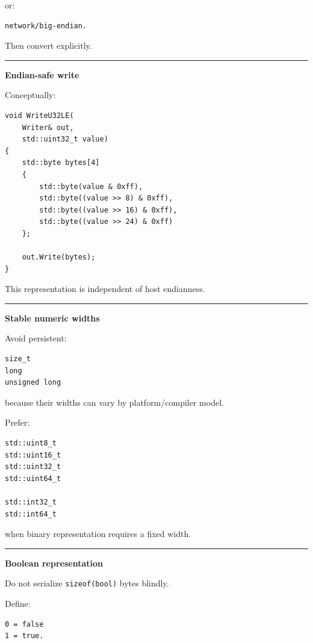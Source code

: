 or:

\begin{verbatim}
network/big-endian.
\end{verbatim}

Then convert explicitly.

\begin{center}\rule{0.5\linewidth}{0.5pt}\end{center}

\textbf{Endian-safe write}

Conceptually:

\begin{verbatim}
void WriteU32LE(
    Writer& out,
    std::uint32_t value)
{
    std::byte bytes[4]
    {
        std::byte(value & 0xff),
        std::byte((value >> 8) & 0xff),
        std::byte((value >> 16) & 0xff),
        std::byte((value >> 24) & 0xff)
    };

    out.Write(bytes);
}
\end{verbatim}

This representation is independent of host endianness.

\begin{center}\rule{0.5\linewidth}{0.5pt}\end{center}

\textbf{Stable numeric widths}

Avoid persistent:

\begin{verbatim}
size_t
long
unsigned long
\end{verbatim}

because their widths can vary by platform/compiler model.

Prefer:

\begin{verbatim}
std::uint8_t
std::uint16_t
std::uint32_t
std::uint64_t

std::int32_t
std::int64_t
\end{verbatim}

when binary representation requires a fixed width.

\begin{center}\rule{0.5\linewidth}{0.5pt}\end{center}

\textbf{Boolean representation}

Do not serialize \texttt{sizeof(bool)} bytes blindly.

Define:

\begin{verbatim}
0 = false
1 = true.
\end{verbatim}

